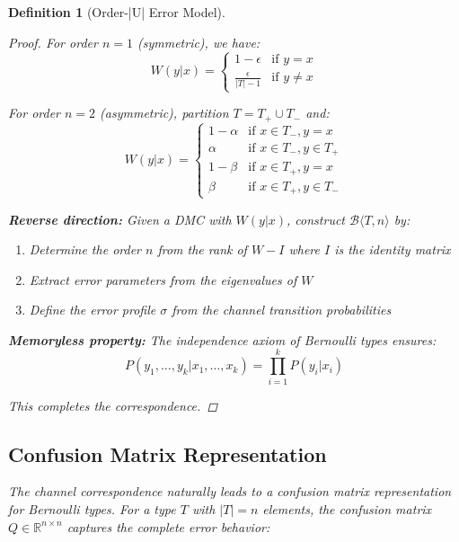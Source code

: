\documentclass[11pt,final,hidelinks]{article}
\newtheorem{definition}[theorem]{Definition}
\newcommand{\bernoulli}[2]{\mathcal{B}\langle #1, #2 \rangle}
\begin{document}
\begin{definition}[Order-|U| Error Model]
\begin{proof}
For order $n = 1$ (symmetric), we have:
\begin{equation}
W(y|x) = \begin{cases}
1 - \epsilon & \text{if } y = x \\
\frac{\epsilon}{|T| - 1} & \text{if } y \neq x
\end{cases}
\end{equation}

For order $n = 2$ (asymmetric), partition $T = T_+ \cup T_-$ and:
\begin{equation}
W(y|x) = \begin{cases}
1 - \alpha & \text{if } x \in T_-, y = x \\
\alpha & \text{if } x \in T_-, y \in T_+ \\
1 - \beta & \text{if } x \in T_+, y = x \\
\beta & \text{if } x \in T_+, y \in T_-
\end{cases}
\end{equation}

\textbf{Reverse direction:} Given a DMC with $W(y|x)$, construct $\bernoulli{T}{n}$ by:
\begin{enumerate}
    \item Determine the order $n$ from the rank of $W - I$ where $I$ is the identity matrix
    \item Extract error parameters from the eigenvalues of $W$
    \item Define the error profile $\sigma$ from the channel transition probabilities
\end{enumerate}

\textbf{Memoryless property:} The independence axiom of Bernoulli types ensures:
\begin{equation}
P(y_1, \ldots, y_k | x_1, \ldots, x_k) = \prod_{i=1}^k P(y_i | x_i)
\end{equation}

This completes the correspondence.
\end{proof}

\subsection{Confusion Matrix Representation}

The channel correspondence naturally leads to a confusion matrix representation for Bernoulli types. For a type $T$ with $|T| = n$ elements, the confusion matrix $Q \in \mathbb{R}^{n \times n}$ captures the complete error behavior:


\end{definition}
\end{document}
